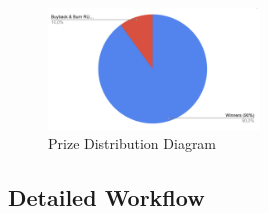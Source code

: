 \documentclass[11pt,a4paper]{article}
\begin{document}
\begin{figure}[H]
    \centering
    \includegraphics[width=0.5\textwidth]{prize_distribution_diagram.pdf}
    \caption{Prize Distribution Diagram}
    \label{fig:prize_distribution}
\end{figure}

\subsection{Detailed Workflow}
\end{document}

